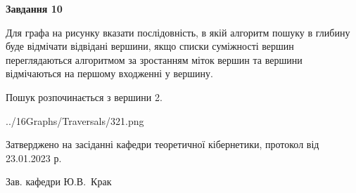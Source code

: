 \documentclass[12pt, ukrainian]{article}
\begin{document}
{\begin {large}
{\begin {center}\textbf{Завдання 10}\end {center}}\par
Для графа на рисунку вказати послідовність, в якій алгоритм пошуку в глибину буде відмічати відвідані вершини, якщо списки суміжності вершин переглядаються алгоритмом за зростанням міток вершин та вершини відмічаються на першому вход\-женні у вершину.\par
Пошук розпочинається з вершини 2.\par

\begin{center}
	{../16Graphs/Traversals/321.png}
\end{center}\par
\newpage


\end {large}
}
{\smallskip \begin {small} Затверджено на засіданні кафедри теоретичної кібернетики, протокол  від   23.01.2023 р.\par\smallskip\smallskip
{\parbox {6.5 cm}{Зав. кафедри \dotfill Ю.В.~Крак}} \end{small}}
\end{document}

